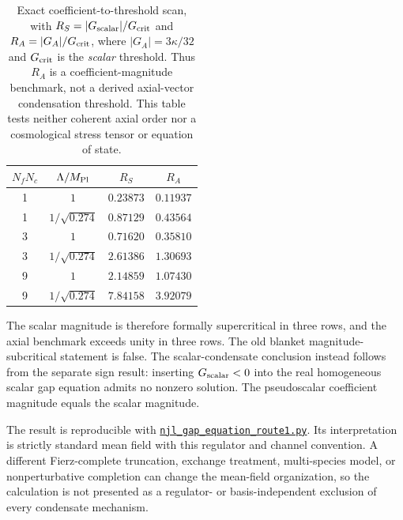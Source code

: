 \documentclass[aps,prd,twocolumn,superscriptaddress,showpacs,preprintnumbers,nofootinbib,longbibliography,floatfix]{revtex4-2}
\newcommand{\artifactnamed}[2]{\href{https://github.com/Hubify-Projects/bigbounce/blob/main/#1}{\nolinkurl{#2}}}
\begin{document}
\begin{table}[tb]
\caption{Exact coefficient-to-threshold scan, with
$R_S=|G_{\rm scalar}|/G_{\rm crit}$ and
$R_A=|G_A|/G_{\rm crit}$, where $|G_A|=3\kappa/32$ and $G_{\rm crit}$ is the
\emph{scalar} threshold.  Thus $R_A$ is a coefficient-magnitude benchmark, not
a derived axial-vector condensation threshold.  This table tests neither
coherent axial order nor a cosmological stress tensor or equation of state.}
\begin{ruledtabular}
\begin{tabular}{cccc}
$N_fN_c$ & $\Lambda/M_{\rm Pl}$ & $R_S$ & $R_A$ \\
\hline
1 & $1$ & $0.23873$ & $0.11937$ \\
1 & $1/\sqrt{0.274}$ & $0.87129$ & $0.43564$ \\
3 & $1$ & $0.71620$ & $0.35810$ \\
3 & $1/\sqrt{0.274}$ & $2.61386$ & $1.30693$ \\
9 & $1$ & $2.14859$ & $1.07430$ \\
9 & $1/\sqrt{0.274}$ & $7.84158$ & $3.92079$ \\
\end{tabular}
\end{ruledtabular}
\end{table}

The scalar magnitude is therefore formally supercritical in three rows,
and the axial benchmark exceeds unity in three rows.  The old blanket
magnitude-subcritical statement is false.  The scalar-condensate conclusion
instead follows from the separate sign result: inserting
$G_{\rm scalar}<0$ into the real homogeneous scalar gap equation admits no
nonzero solution.  The pseudoscalar coefficient magnitude equals the scalar
magnitude.

The result is reproducible with
\artifactnamed{arxiv/scripts/njl_gap_equation_route1.py}{njl_gap_equation_route1.py}.  Its interpretation is
strictly standard mean field with this regulator and channel convention.  A
different Fierz-complete truncation, exchange treatment, multi-species model,
or nonperturbative completion can change the mean-field organization, so the
calculation is not presented as a regulator- or basis-independent exclusion
of every condensate mechanism.
\end{document}
